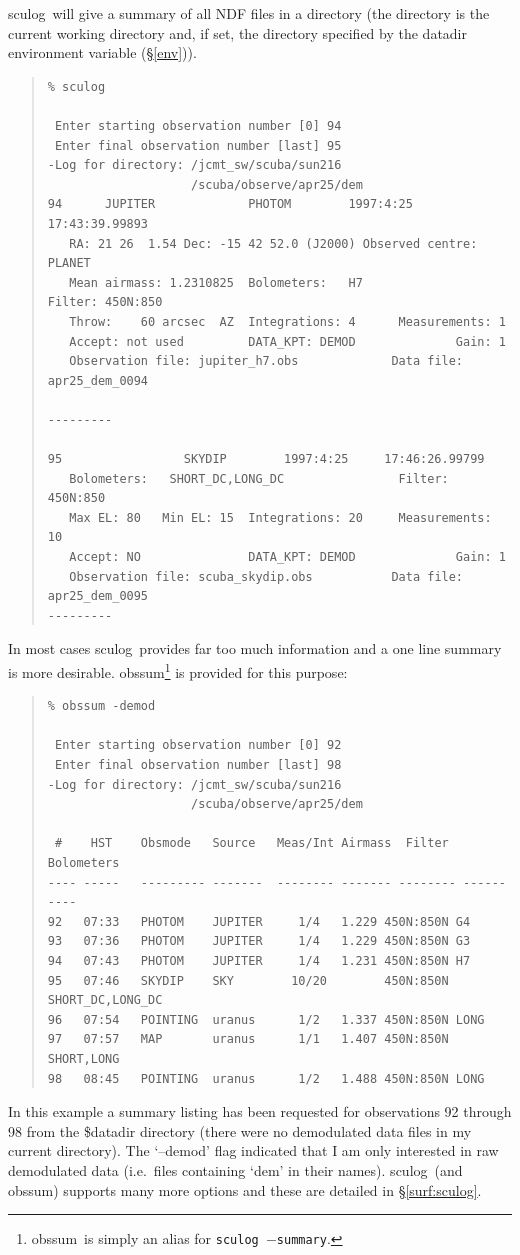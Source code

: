 \documentclass[twoside,11pt]{article}
\newcommand{\task}[1]{{\sf #1}}
\newcommand{\sculog}{\htmlref{\task{sculog}}{SCULOG}}
\newcommand{\obssum}{\htmlref{\task{obssum}}{OBSSUM}}
\newenvironment{myquote}{\begin{quote}\begin{small}}{\end{small}\end{quote}}
\newcommand{\htmlref}[2]{#1}
\renewcommand{\_}{\texttt{\symbol{95}}}
\begin{document}
\sculog\ will give a summary of all NDF files in
a directory (the directory is the current working directory and, if set, the
directory specified by the {\sc datadir} environment variable (\S\ref{env})).
\begin{myquote}
\begin{verbatim}
% sculog
 
 Enter starting observation number [0] 94
 Enter final observation number [last] 95
-Log for directory: /jcmt_sw/scuba/sun216
                    /scuba/observe/apr25/dem
94      JUPITER             PHOTOM        1997:4:25     17:43:39.99893
   RA: 21 26  1.54 Dec: -15 42 52.0 (J2000) Observed centre: PLANET
   Mean airmass: 1.2310825  Bolometers:   H7                Filter: 450N:850
   Throw:    60 arcsec  AZ  Integrations: 4      Measurements: 1
   Accept: not used         DATA_KPT: DEMOD              Gain: 1
   Observation file: jupiter_h7.obs             Data file: apr25_dem_0094
 
---------
 
95                 SKYDIP        1997:4:25     17:46:26.99799
   Bolometers:   SHORT_DC,LONG_DC                Filter: 450N:850
   Max EL: 80   Min EL: 15  Integrations: 20     Measurements: 10
   Accept: NO               DATA_KPT: DEMOD              Gain: 1
   Observation file: scuba_skydip.obs           Data file: apr25_dem_0095
---------
\end{verbatim}
\end{myquote}
In most cases \sculog\ provides far too much information and a one 
line summary is more desirable. \obssum\footnote{\obssum\ is simply an alias
for \texttt{\sculog\ $-$summary}.} is provided for this purpose:
\begin{myquote}
\begin{verbatim}
% obssum -demod
 
 Enter starting observation number [0] 92
 Enter final observation number [last] 98
-Log for directory: /jcmt_sw/scuba/sun216
                    /scuba/observe/apr25/dem
 
 #    HST    Obsmode   Source   Meas/Int Airmass  Filter  Bolometers
---- -----   --------- -------  -------- ------- -------- ----------
92   07:33   PHOTOM    JUPITER     1/4   1.229 450N:850N G4
93   07:36   PHOTOM    JUPITER     1/4   1.229 450N:850N G3
94   07:43   PHOTOM    JUPITER     1/4   1.231 450N:850N H7
95   07:46   SKYDIP    SKY        10/20        450N:850N SHORT_DC,LONG_DC
96   07:54   POINTING  uranus      1/2   1.337 450N:850N LONG
97   07:57   MAP       uranus      1/1   1.407 450N:850N SHORT,LONG
98   08:45   POINTING  uranus      1/2   1.488 450N:850N LONG
\end{verbatim}
\end{myquote}
In this example a summary listing has been requested for observations 92
through 98 from the {\sc \$datadir} directory %
(there were no
demodulated data files in my current directory).  The `--demod' flag indicated
that I am only interested in raw demodulated data (i.e.\ files containing
`\_dem\_' in their names). \sculog\ (and \obssum) supports many more options
and these are detailed in \S\ref{surf:sculog}.
\end{document}
